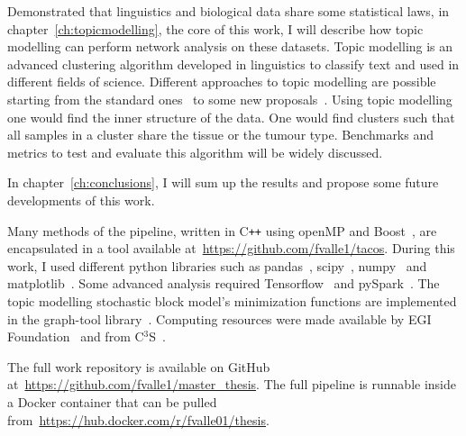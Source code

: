 Demonstrated that linguistics and biological data share some statistical laws, in chapter~\ref{ch:topicmodelling}, the core of this work, I will describe how topic modelling can perform network analysis on these datasets. Topic modelling is an advanced clustering algorithm developed in linguistics to classify text and used in different fields of science. Different approaches to topic modelling are possible starting from the standard ones~\cite{Zhou2016} to some new proposals~\cite{Lancichinetti2015,Martini2017,gerlach2018network}. Using topic modelling one would find the inner structure of the data. One would find clusters such that all samples in a cluster share the tissue or the tumour type. Benchmarks and metrics to test and evaluate this algorithm will be widely discussed.

In chapter~\ref{ch:conclusions}, I will sum up the results and propose some future developments of this work.

Many methods of the pipeline, written in C\texttt{++} using openMP and Boost~\cite{siek2002boost}, are encapsulated in a tool available at~\url{https://github.com/fvalle1/tacos}. During this work, I used different python libraries such as pandas~\cite{mckinney2010data}, scipy~\cite{jones2014scipy}, numpy~\cite{oliphant2006guide} and matplotlib~\cite{hunter2007matplotlib}. Some advanced analysis required Tensorflow~\cite{tensorflow2015-whitepaper} and pySpark~\cite{Zaharia:2016:ASU:3013530.2934664}. The topic modelling stochastic block model's minimization functions are implemented in the graph-tool library~\cite{peixoto_graph-tool_2014}. Computing resources were made available by EGI Foundation~\cite{fernandez2015egi} and from C$^{\text{3}}$S~\cite{occamchep}.

The full work repository is available on GitHub\textsuperscript{\tiny\textcopyright} at~\url{https://github.com/fvalle1/master_thesis}. The full pipeline is runnable inside a Docker\textsuperscript{\tiny\textcopyright} container that can be pulled from~\url{https://hub.docker.com/r/fvalle01/thesis}. 